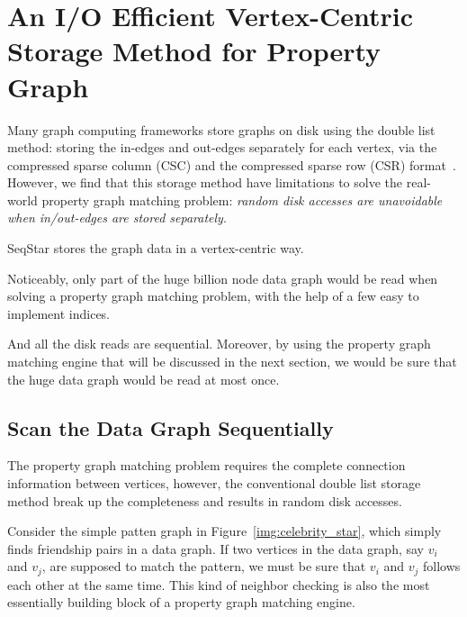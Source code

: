 \section{An I/O Efficient Vertex-Centric Storage Method for Property Graph}\label{sec:storage}

Many graph computing frameworks store graphs on disk using the double list method:
storing the in-edges and out-edges separately for each vertex,
via the compressed sparse column (CSC) and the compressed sparse row (CSR) format~\cite{DBLP:conf/sc/PearceGA10}.
However, we find that this storage method have limitations to solve the real-world property graph matching problem:
\emph{random disk accesses are unavoidable when in/out-edges are stored separately}. %

SeqStar stores the graph data in a vertex-centric way. 

Noticeably, only part of the huge billion node data graph would be read when solving a property graph matching problem,
with the help of a few easy to implement indices.

And all the disk reads are sequential.
Moreover, by using the property graph matching engine that will be discussed in the next section,
we would be sure that the huge data graph would be read at most once.
\subsection{Scan the Data Graph Sequentially}
The property graph matching problem requires the complete connection information between vertices,
however, the conventional double list storage method break up the completeness and results in random disk accesses.

Consider the simple patten graph in Figure~\ref{img:celebrity_star}, which simply finds friendship pairs in a data graph.
If two vertices in the data graph, say $v_i$ and $v_j$, are supposed to match the pattern,
we must be sure that $v_i$ and $v_j$ follows each other at the same time.
This kind of neighbor checking is also the most essentially building block of a property graph matching engine.

